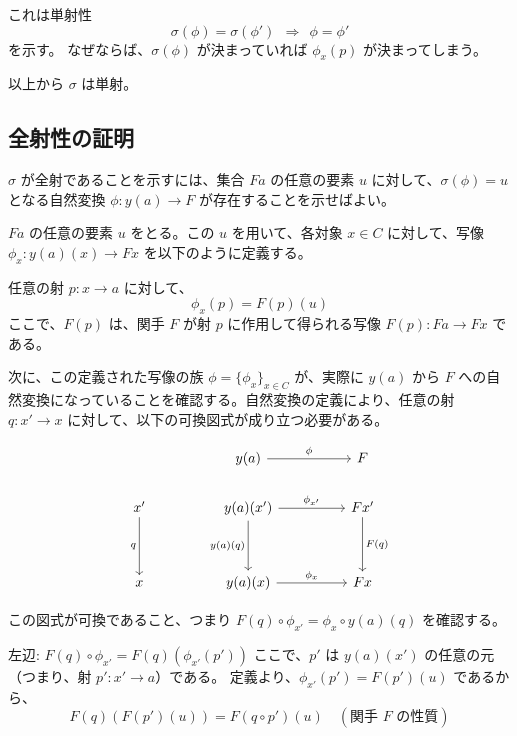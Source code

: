 \documentclass[uplatex,a4j,12pt,dvipdfmx]{jsarticle}
\begin{document}
これは単射性
\[
	\sigma(\phi) = \sigma(\phi') \ \ \Rightarrow \ \ \phi = \phi'
\]
を示す。
なぜならば、$\sigma(\phi)$ が決まっていれば $\phi_{x}(p)$ が決まってしまう。

以上から $\sigma$ は単射。



\subsection{全射性の証明}

$\sigma$ が全射であることを示すには、集合 $Fa$ の任意の要素 $u$ に対して、$\sigma(\phi) = u$ となる自然変換 $\phi: y(a) \to F$ が存在することを示せばよい。

$Fa$ の任意の要素 $u$ をとる。この $u$ を用いて、各対象 $x \in C$ に対して、写像 $\phi_x : y(a)(x) \to Fx$ を以下のように定義する。

任意の射 $p: x \to a$ に対して、
$$ \phi_x(p) = F(p)(u) $$
ここで、$F(p)$ は、関手 $F$ が射 $p$ に作用して得られる写像 $F(p): Fa \to Fx$ である。

次に、この定義された写像の族 $\phi = \{\phi_x\}_{x \in C}$ が、実際に $y(a)$ から $F$ への自然変換になっていることを確認する。自然変換の定義により、任意の射 $q: x' \to x$ に対して、以下の可換図式が成り立つ必要がある。

\[
	\begin{tikzcd}
		&  & y(a) \arrow[rr, "\phi"]                                 &  & F                      \\
		x' \arrow[dd, "q"'] &  & y(a)(x') \arrow[dd, "y(a)(q)"'] \arrow[rr, "\phi_{x'}"] &  & Fx' \arrow[dd, "F(q)"] \\
		&  &                                                         &  &                        \\
		x                   &  & y(a)(x) \arrow[rr, "\phi_{x}"]                          &  & Fx
	\end{tikzcd}
\]

この図式が可換であること、つまり $F(q) \circ \phi_{x'} = \phi_x \circ y(a)(q)$ を確認する。

左辺: $F(q) \circ \phi_{x'} = F(q)(\phi_{x'}(p'))$
ここで、$p'$ は $y(a)(x')$ の任意の元（つまり、射 $p': x' \to a$）である。
定義より、$\phi_{x'}(p') = F(p')(u)$ であるから、
$$ F(q)(F(p')(u)) = F(q \circ p')(u) \quad (\text{関手 } F \text{ の性質}) $$
\end{document}
